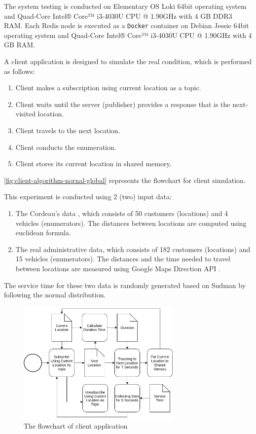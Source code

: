 \documentclass[conference]{IEEEtran}
\begin{document}
The system testing is conducted on Elementary OS Loki 64bit operating system and Quad-Core Intel® Core™ i3-4030U CPU @ 1.90GHz with 4 GB DDR3 RAM. Each Redis node is executed as a \verb|Docker| container on Debian Jessie 64bit operating system and Quad-Core Intel® Core™ i3-4030U CPU @ 1.90GHz with 4 GB RAM. 

A client application is designed to simulate the real condition, which is performed as follows:
\begin{enumerate}
	\item Client makes a subscription using current location as a topic. 
	\item Client waits until the server (publisher) provides a response that is the next-visited location. 
	\item Client travels to the next location. 
	\item Client conducts the enumeration.
	\item Client stores its current location in shared memory. 
\end{enumerate}
\autoref{fig:client-algorithm-nornal-global} represents the flowchart for client simulation. 


This experiment is conducted using 2 (two) input data: 

\begin{enumerate}
	\item The Cordeau's data \cite{cordeau_tabu_1997}, which consists of 50 customers (locations) and 4 vehicles (enumerators). The distances between locations are computed using euclidean formula. 
	\item The real administrative data, which consists of 182 customers (locations) and 15 vehicles (enumerators). The distances and the time needed to travel between locations are measured using Google Maps Direction API \cite{google_google_2016}. 
\end{enumerate}
The service time for these two data is randomly generated based on Sudman \cite{sudman_time_1965} by following the normal distribution. 

\begin{figure}[!]
	\centering
	\includegraphics[width=8cm]{Resources/Images/client-algorithm-nornal-global}
	\caption{The flowchart of client application}
	\label{fig:client-algorithm-nornal-global}
\end{figure}
\end{document}

